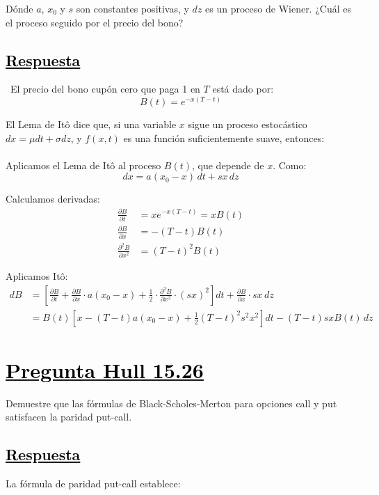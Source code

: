 \documentclass[12pt]{article}
\newcommand{\subrayadoRojo}[1]{{\color{rojoudp}\underline{\textcolor{black}{#1}}}}
\renewcommand{\thesection}{Pregunta \arabic{section}}
\newcommand{\pregunta}[1]{%
  \section*{\subrayadoRojo{\thesection  #1}}%
  \stepcounter{section}%
}
\newcounter{subpreg}
\newcommand{\subpregunta}[1]{%
  \subsection*{\subrayadoRojo{#1}}%
}
\begin{document}
Dónde \( a \), \( x_0 \) y \( s \) son constantes positivas, y \( dz \) es un proceso de Wiener. ¿Cuál es el proceso seguido por el precio del bono?

\subpregunta{Respuesta}

\ El precio del bono cupón cero que paga 1 en \( T \) está dado por:
\[
B(t) = e^{-x(T - t)}
\]

\noindent
El Lema de Itô dice que, si una variable \( x \) sigue un proceso estocástico \( dx = \mu dt + \sigma dz \), y \( f(x,t) \) es una función suficientemente suave, entonces:\\
\formula{\ito}\\

Aplicamos el Lema de Itô al proceso \( B(t) \), que depende de \( x \). Como:
\[
dx = a(x_0 - x)\,dt + s x\,dz
\]

Calculamos derivadas:
\begin{align*}
    \frac{\partial B}{\partial t} &= x e^{-x(T - t)} = x B(t) \\
    \frac{\partial B}{\partial x} &= - (T - t) B(t) \\
    \frac{\partial^2 B}{\partial x^2} &= (T - t)^2 B(t)
\end{align*}

Aplicamos Itô:
\begin{align*}
    dB &= \left[ \frac{\partial B}{\partial t} + \frac{\partial B}{\partial x} \cdot a(x_0 - x) + \frac{1}{2} \cdot \frac{\partial^2 B}{\partial x^2} \cdot (s x)^2 \right] dt + \frac{\partial B}{\partial x} \cdot s x \, dz \\
    &= B(t) \left[ x - (T - t) a (x_0 - x) + \frac{1}{2} (T - t)^2 s^2 x^2 \right] dt - (T - t) s x B(t) \, dz
\end{align*}
\pregunta{ Hull 15.26}

Demuestre que las fórmulas de Black-Scholes-Merton para opciones call y put satisfacen la paridad put-call.

\subpregunta{Respuesta}
\noindent La fórmula de paridad put-call establece:\\
\formula{\putcall}\\[0.5em]
\end{document}
